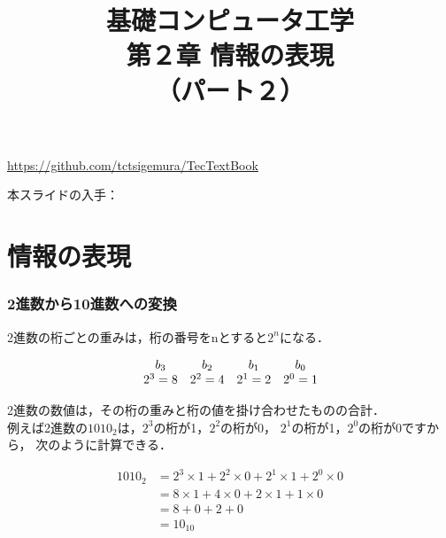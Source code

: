 \documentclass[handout]{beamer}        %
\begin{document}
\title{基礎コンピュータ工学\\第２章 情報の表現\\（パート２）}
\date{}

\begin{frame}
  \titlepage
  \centerline{\url{https://github.com/tctsigemura/TecTextBook}}
  \vfill
  \centerline{本スライドの入手：
    }
\end{frame}


\section{情報の表現}
\begin{frame}
  \frametitle{2進数から10進数への変換}
  2進数の桁ごとの重みは，桁の番号をnとすると$2^n$になる．

\[
\begin{array}{c c c c c }
b_3     & b_2     & b_1     & b_0     \\
2^3 = 8 & 2^2 = 4 & 2^1 = 2 & 2^0 = 1 \\
\end{array}
\]

2進数の数値は，その桁の重みと桁の値を掛け合わせたものの合計．\\
例えば2進数の$1010_2$は，$2^3$の桁が1，$2^2$の桁が0，
$2^1$の桁が1，$2^0$の桁が0ですから，
次のように計算できる．

\begin{align*}
1010_2 &= 2^3 \times 1 + 2^2 \times 0 + 2^1 \times 1 + 2^0 \times 0 \\
       &= 8 \times 1 + 4 \times 0 + 2 \times 1 + 1 \times 0 \\
       &= 8 + 0 + 2 + 0 \\
       &= 10_{10}
\end{align*}
\end{frame}
\end{document}
